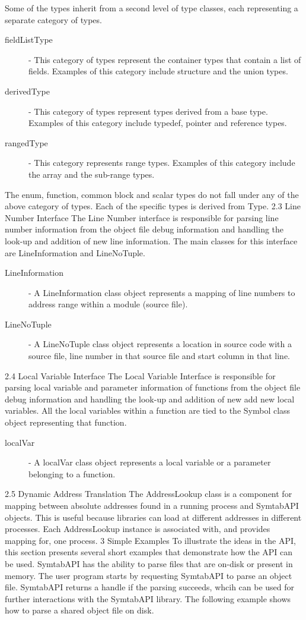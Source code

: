 Some of the types inherit from a second level of type classes, each representing a separate category of types. 
\begin{description}
\item[fieldListType] - This category of types represent the container types that contain a list of fields. Examples of this category include structure and the union types. 
\item[derivedType] - This category of types represent types derived from a base type. Examples of this category include typedef, pointer and reference types. 
\item[rangedType] - This category represents range types. Examples of this category include the array and the sub-range types. 
\end{description}
The enum, function, common block and scalar types do not fall under any of the above category of types. Each of the specific types is derived from Type.
2.3 Line Number Interface
The Line Number interface is responsible for parsing line number information from the object file debug information and handling the look-up and addition of new line information. The main classes for this interface are LineInformation and LineNoTuple. 
\begin{description}
\item[LineInformation] - A LineInformation class object represents a mapping of line numbers to address range within a module (source file). 
\item[LineNoTuple] - A LineNoTuple class object represents a location in source code with a source file, line number in that source file and start column in that line.
\end{description}
2.4 Local Variable Interface
The Local Variable Interface is responsible for parsing local variable and parameter information of functions from the object file debug information and handling the look-up and addition of new add new local variables. All the local variables within a function are tied to the Symbol class object representing that function.
\begin{description}
\item[localVar] - A localVar class object represents a local variable or a parameter belonging to a function.
\end{description}
2.5 Dynamic Address Translation
The AddressLookup class is a component for mapping between absolute addresses found in a running process and SymtabAPI objects. This is useful because libraries can load at different addresses in different processes. Each AddressLookup instance is associated with, and provides mapping for, one process.
3 Simple Examples
To illustrate the ideas in the API, this section presents several short examples that demonstrate how the API can be used. 
SymtabAPI has the ability to parse files that are on-disk or present in memory. The user program starts by requesting SymtabAPI to parse an object file. SymtabAPI returns a handle if the parsing succeeds, whcih can be used for further interactions with the SymtabAPI library. The following example shows how to parse a shared object file on disk.

